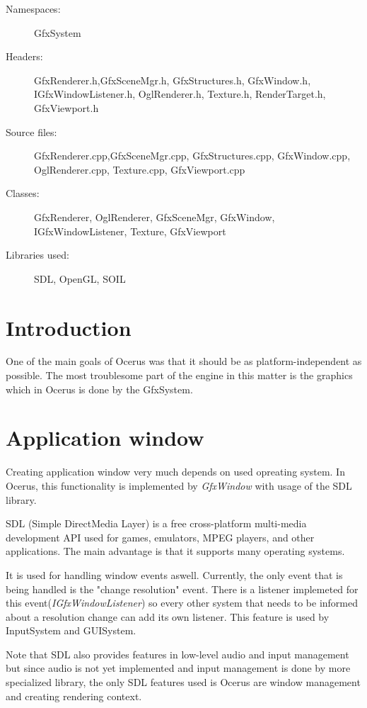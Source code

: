 \begin{description}
  \item[Namespaces:] GfxSystem
  \item[Headers:]GfxRenderer.h,GfxSceneMgr.h, GfxStructures.h, GfxWindow.h, IGfxWindowListener.h, OglRenderer.h, Texture.h, RenderTarget.h, GfxViewport.h
  \item[Source files:] GfxRenderer.cpp,GfxSceneMgr.cpp, GfxStructures.cpp, GfxWindow.cpp, OglRenderer.cpp, Texture.cpp, GfxViewport.cpp
  \item[Classes:] GfxRenderer, OglRenderer, GfxSceneMgr, GfxWindow, IGfxWindowListener, Texture, GfxViewport
  \item[Libraries used:] SDL, OpenGL, SOIL
\end{description}

\section{Introduction}

One of the main goals of Ocerus was that it should be as platform-independent as possible. The most troublesome part of the engine in this matter is the graphics which in Ocerus is done by the GfxSystem.


\section{Application window}
Creating application window very much depends on used opreating system. In Ocerus, this functionality is implemented by \emph{GfxWindow} with usage of the SDL library.

SDL (Simple DirectMedia Layer) is a free cross-platform multi-media development API used for games, emulators, MPEG players, and other applications. The main advantage is that it supports many operating systems.

It is used for handling window events aswell. Currently, the only event that is being handled is the "change resolution" event. There is a listener implemeted for this event(\emph{IGfxWindowListener}) so every other system that needs to be informed about a resolution change can add its own listener. This feature is used by InputSystem and GUISystem.

Note that SDL also provides features in low-level audio and input management but since audio is not yet implemented and input management is done by more specialized library, the only SDL features used is Ocerus are window management and creating rendering context.

